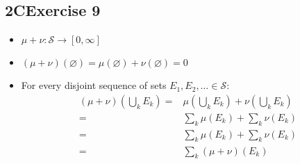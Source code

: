 \documentclass[12pt, letterpaper]{article}
\renewcommand{\S}{\mathcal{S}}
\begin{document}
\subsection*{2\hspace{1pt}C\hspace{20pt}Exercise 9}
\begin{itemize}
    \item $\mu+\nu:\S\rightarrow[0,\infty]$
    \item $(\mu+\nu)(\varnothing)=\mu(\varnothing)+\nu(\varnothing)=0$
    \item For every disjoint sequence of sets $E_1, E_2, \dots\in\S$:
    \begin{align*}
        (\mu+\nu)(\bigcup_k E_k)=&\mu(\bigcup_k E_k)+\nu(\bigcup_k E_k)\\
        =&\sum_k\mu(E_k)+\sum_k\nu(E_k)\\
        =&\sum_k \mu(E_k)+\sum_k\nu(E_k)\\
        =&\sum_k (\mu+\nu)(E_k)
    \end{align*}
\end{itemize}

\clearpage
\end{document}
